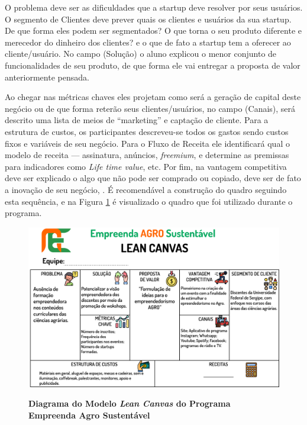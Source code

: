 O problema deve ser as dificuldades que a startup deve resolver por seus usuários. O segmento de Clientes deve prever quais os clientes e usuários da sua startup. De que forma eles podem ser segmentados? O que torna o seu produto diferente e merecedor do dinheiro dos clientes? e o que de fato a startup tem a oferecer ao cliente/usuário. No campo (Solução) o aluno explicou o menor conjunto de funcionalidades de seu produto, de que forma ele vai entregar a proposta de valor anteriormente pensada.

Ao chegar nas métricas chaves eles projetam como será a geração de capital deste negócio ou de que forma reterão seus clientes/usuários, no campo (Canais), será descrito uma lista de meios de “marketing” e captação de cliente. Para a estrutura de custos, os participantes descreveu-se todos os gastos sendo custos fixos e variáveis de seu negócio. Para o Fluxo de Receita ele identificará qual o modelo de receita — assinatura, anúncios, \textit{freemium}, e determine as premissas para indicadores como \textit{Life time value}, etc. Por fim, na vantagem competitiva deve ser explicado o algo que não pode ser comprado ou copiado, deve ser de fato a inovação de seu negócio,  \cite{maurya_running_2012, sebrae_aprenda_2019}. É recomendável a construção do quadro seguindo esta sequência, e na Figura \ref{figura_7} é visualizado o quadro que foi utilizado durante o programa.



\begin{figure}[h!]
\centering
\caption{\textbf{Diagrama do Modelo  \textit{Lean Canvas} do Programa Empreenda Agro Sustentável}}
\includegraphics[scale=0.1]{Imagens/canvas.png}
\label{figura_7}
\end{figure}


